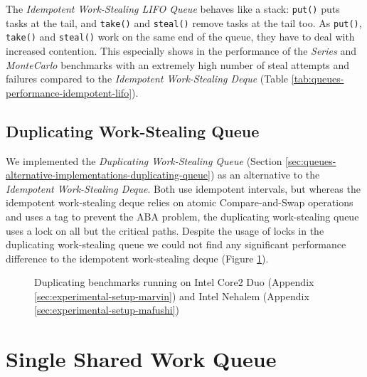 The \emph{Idempotent Work-Stealing LIFO Queue} behaves like a stack:
\lstinline!put()! puts tasks at the tail, and \lstinline!take()!  and
\lstinline!steal()! remove tasks at the tail too. As
\lstinline!put()!, \lstinline!take()! and \lstinline!steal()! work on
the same end of the queue, they have to deal with increased
contention. This especially shows in the performance of the
\emph{Series} and \emph{MonteCarlo} benchmarks with an extremely high
number of steal attempts and failures compared to the \emph{Idempotent
  Work-Stealing Deque} (Table
\ref{tab:queues-performance-idempotent-lifo}).

\subsection{Duplicating Work-Stealing Queue}
\label{sec:performance-alternative-duplicating}

We implemented the \emph{Duplicating Work-Stealing Queue} (Section
\ref{sec:queues-alternative-implementations-duplicating-queue}) as an
alternative to the \emph{Idempotent Work-Stealing Deque}. Both use
idempotent intervals, but whereas the idempotent work-stealing deque
relies on atomic Compare-and-Swap operations and uses a tag to prevent
the ABA problem, the duplicating work-stealing queue uses a lock on
all but the critical paths. Despite the usage of locks in the
duplicating work-stealing queue we could not find any significant
performance difference to the idempotent work-stealing deque (Figure
\ref{fig:queues-performance-duplicating}).

\begin{figure}[!htb]
  \centering
  \caption[Duplicating benchmarks]{Duplicating benchmarks running on
    Intel Core2 Duo (Appendix \ref{sec:experimental-setup-marvin}) and
    Intel Nehalem (Appendix \ref{sec:experimental-setup-mafushi})}
  \label{fig:queues-performance-duplicating}
\end{figure}


\section{Single Shared Work Queue}
\label{sec:queues-performance-single-shared-queue}

